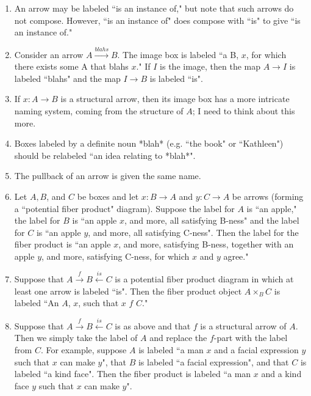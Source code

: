 \documentclass{amsart}
\def\to{\rightarrow}
\def\To{\xrightarrow}
\def\taking{\colon}
\def\From{\xleftarrow}
\def\cross{\times}
\begin{document}
\begin{enumerate}
\item An arrow may be labeled ``is an instance of," but note that such arrows do not compose.  However, ``is an instance of" does compose with ``is" to give ``is an instance of." 

\item Consider an arrow $A\To{blahs}B$.  The image box is labeled ``a B, $x$, for which there exists some A that blahs $x$."  If $I$ is the image, then the map $A\to I$ is labeled ``blahs" and the map $I\to B$ is labeled ``is".  

\item If $x\taking A\to B$ is a structural arrow, then its image box has a more intricate naming system, coming from the structure of $A$; I need to think about this more.

\item Boxes labeled by a definite noun *blah* (e.g. ``the book" or ``Kathleen") should be relabeled ``an idea relating to *blah*".

\item The pullback of an arrow is given the same name.

\item Let $A, B$, and $C$ be boxes and let $x\taking B\to A$ and $y\taking C\to A$ be arrows (forming a ``potential fiber product" diagram).  Suppose the label for $A$ is ``an apple," the label for $B$ is ``an apple $x$, and more, all satisfying B-ness" and the label for $C$ is ``an apple $y$, and more, all satisfying C-ness".  Then the label for the fiber product is ``an apple $x$, and more, satisfying B-ness, together with an apple $y$, and more, satisfying C-ness, for which $x$ and $y$ agree."  

\item Suppose that $A\To{f}B\From{is} C$ is a potential fiber product diagram in which at least one arrow is labeled ``is".  Then the fiber product object $A\cross_BC$ is labeled ``An $A$, $x$, such that $x$ $f$ $C$."

\item Suppose that $A\To{f}B\From{is} C$ is as above and that $f$ is a structural arrow of $A$.  Then we simply take the label of $A$ and replace the $f$-part with the label from $C$.  For example, suppose $A$ is labeled ``a man $x$ and a facial expression $y$ such that $x$ can make $y$", that $B$ is labeled ``a facial expression", and that $C$ is labeled ``a kind face".  Then the fiber product is labeled ``a man $x$ and a kind face $y$ such that $x$ can make $y$".



\end{enumerate}
\end{document}
